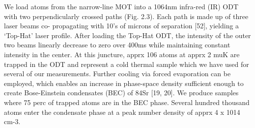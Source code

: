 We load atoms from the narrow-line MOT into a 1064nm infra-red (IR) ODT with two perpendicularly crossed paths (Fig. 2.3). 
Each path is made up of three laser beams co- propagating with 10’s of microns of separation [52], yielding a ‘Top-Hat’ laser profile. 
After loading the Top-Hat ODT, the intensity of the outer two beams linearly decrease to zero over 400ms while maintaining constant intensity in the center. 
At this juncture, apprx 106 atoms at apprx 2 muK are trapped in the ODT and represent a cold thermal sample which we have used for several of our measurements. 
Further cooling via forced evaporation can be employed, which enables an increase in phase-space density sufficient enough to create Bose-Einstein condensates (BEC) of 84Sr [19, 20]. 
We produce samples where 75 perc of trapped atoms are in the BEC phase. Several hundred thousand atoms enter the condensate phase at a peak number density of apprx 4 x 1014 cm-3.

